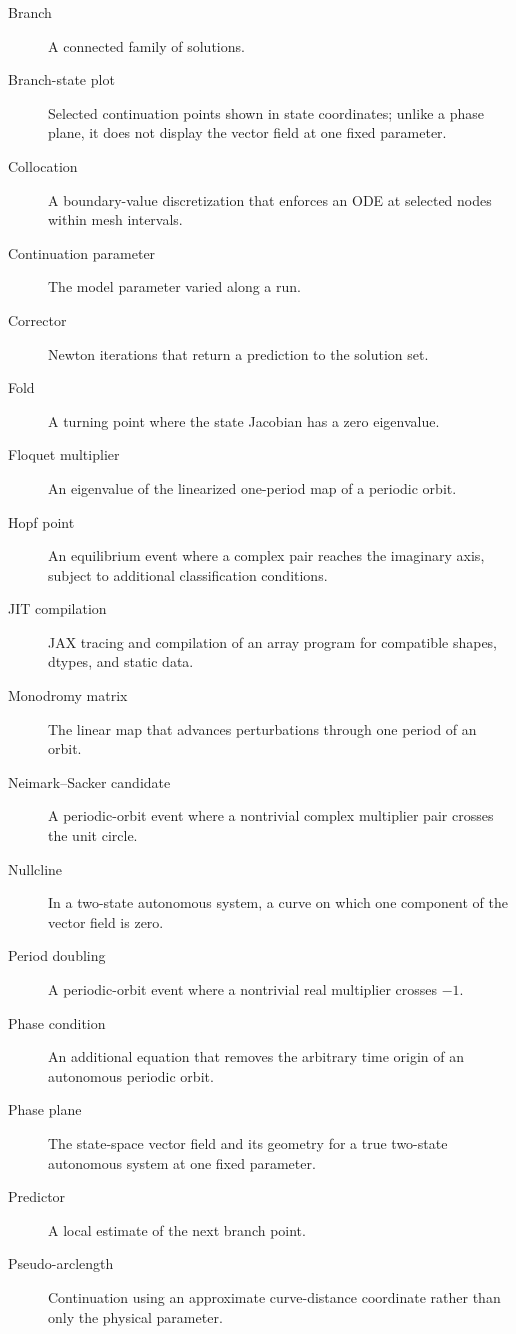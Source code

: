 \documentclass[11pt,oneside]{book}
\begin{document}
\begin{description}
  \item[Branch] A connected family of solutions.
  \item[Branch-state plot] Selected continuation points shown in state
        coordinates; unlike a phase plane, it does not display the vector
        field at one fixed parameter.
  \item[Collocation] A boundary-value discretization that enforces an ODE at
        selected nodes within mesh intervals.
  \item[Continuation parameter] The model parameter varied along a run.
  \item[Corrector] Newton iterations that return a prediction to the solution set.
  \item[Fold] A turning point where the state Jacobian has a zero eigenvalue.
  \item[Floquet multiplier] An eigenvalue of the linearized one-period map of a
        periodic orbit.
  \item[Hopf point] An equilibrium event where a complex pair reaches the
        imaginary axis, subject to additional classification conditions.
  \item[JIT compilation] JAX tracing and compilation of an array program for
        compatible shapes, dtypes, and static data.
  \item[Monodromy matrix] The linear map that advances perturbations through
        one period of an orbit.
  \item[Neimark--Sacker candidate] A periodic-orbit event where a nontrivial
        complex multiplier pair crosses the unit circle.
  \item[Nullcline] In a two-state autonomous system, a curve on which one
        component of the vector field is zero.
  \item[Period doubling] A periodic-orbit event where a nontrivial real
        multiplier crosses $-1$.
  \item[Phase condition] An additional equation that removes the arbitrary
        time origin of an autonomous periodic orbit.
  \item[Phase plane] The state-space vector field and its geometry for a true
        two-state autonomous system at one fixed parameter.
  \item[Predictor] A local estimate of the next branch point.
  \item[Pseudo-arclength] Continuation using an approximate curve-distance
        coordinate rather than only the physical parameter.

\end{description}
\end{document}

